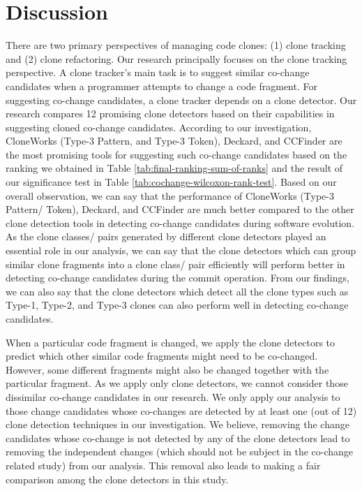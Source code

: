 \documentclass[review]{elsarticle}
\begin{document}
\section{Discussion}
\label{the-discussion}
There are two primary perspectives of managing code clones: (1) clone tracking and (2) clone refactoring. Our research principally focuses on the clone tracking perspective. A clone tracker's main task is to suggest similar co-change candidates when a programmer attempts to change a code fragment. For suggesting co-change candidates, a clone tracker depends on a clone detector. Our research compares 12 promising clone detectors based on their capabilities in suggesting cloned co-change candidates. According to our investigation, CloneWorks (Type-3 Pattern, and Type-3 Token), Deckard, and CCFinder are the most promising tools for suggesting such co-change candidates based on the ranking we obtained in Table \ref{tab:final-ranking-sum-of-ranks} and the result of our significance test in Table \ref{tab:cochange-wilcoxon-rank-test}. Based on our overall observation, we can say that the performance of CloneWorks (Type-3 Pattern/ Token), Deckard, and CCFinder are much better compared to the other clone detection tools in detecting co-change candidates during software evolution. As the clone classes/ pairs generated by different clone detectors played an essential role in our analysis, we can say that the clone detectors which can group similar clone fragments into a clone class/ pair efficiently will perform better in detecting co-change candidates during the commit operation. From our findings, we can also say that the clone detectors which detect all the clone types such as Type-1, Type-2, and Type-3 clones can also perform well in detecting co-change candidates. 

When a particular code fragment is changed, we apply the clone detectors to predict which other similar code fragments might need to be co-changed. However, some different fragments might also be changed together with the particular fragment. As we apply only clone detectors, we cannot consider those dissimilar co-change candidates in our research. We only apply our analysis to those change candidates whose co-changes are detected by at least one (out of 12) clone detection techniques in our investigation. We believe, removing the change candidates whose co-change is not detected by any of the clone detectors lead to removing the independent changes (which should not be subject in the co-change related study) from our analysis.  This removal also leads to making a fair comparison among the clone detectors in this study.
\end{document}
